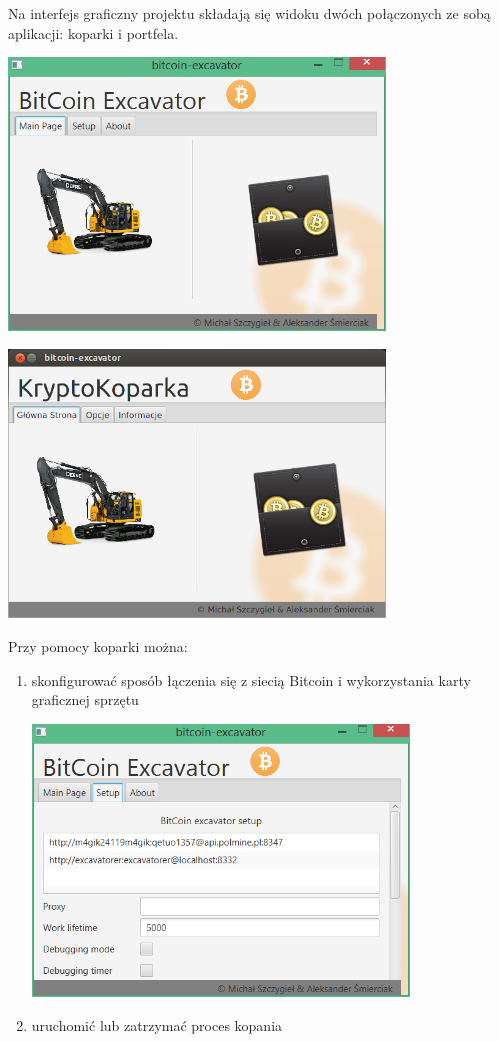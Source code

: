 \documentclass[11pt,a4paper]{article}
\begin{document}
Na interfejs graficzny projektu składają się widoku dwóch połączonych ze sobą aplikacji: koparki i portfela.

\includegraphics[width=10cm]{images/excavator_main_screen.PNG}

\includegraphics[width=10cm]{images/excavator_main_screen_ubuntu.PNG}

Przy pomocy koparki można:
\begin{enumerate}
 \item skonfigurować sposób łączenia się z siecią Bitcoin i wykorzystania karty graficznej sprzętu
 
        \includegraphics[width=10cm]{images/excavator_options_screen.PNG}
 \item uruchomić lub zatrzymać proces kopania
\end{enumerate}
\end{document}
